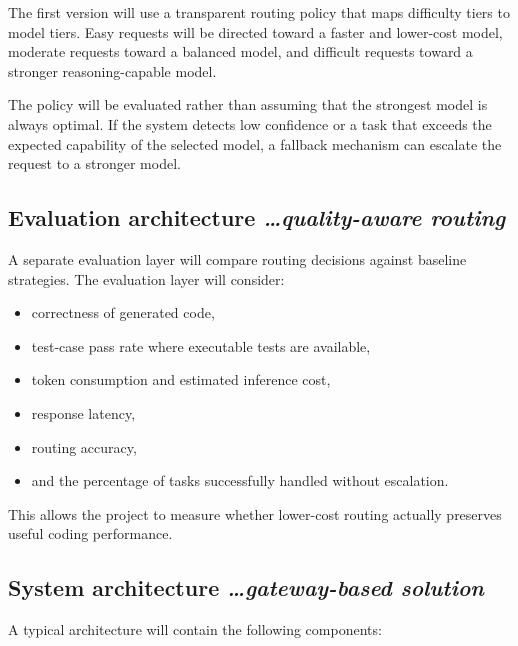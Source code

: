 \documentclass[11pt,a4paper]{article}
\newcommand{\BvrHint}[1]{%
  {\normalfont\normalsize\itshape\hfill #1}%
}
\begin{document}
The first version will use a transparent routing policy that
maps difficulty tiers to model tiers. Easy requests will be
directed toward a faster and lower-cost model, moderate
requests toward a balanced model, and difficult requests
toward a stronger reasoning-capable model.

The policy will be evaluated rather than assuming that the
strongest model is always optimal. If the system detects low
confidence or a task that exceeds the expected capability of
the selected model, a fallback mechanism can escalate the
request to a stronger model.

\subsection{Evaluation architecture%
  \texorpdfstring{\BvrHint{\ldots quality-aware routing}}{}}

A separate evaluation layer will compare routing decisions
against baseline strategies. The evaluation layer will
consider:

\begin{itemize}[leftmargin=0.7cm]

    \item correctness of generated code,
    \item test-case pass rate where executable tests are
    available,
    \item token consumption and estimated inference cost,
    \item response latency,
    \item routing accuracy,
    \item and the percentage of tasks successfully handled
    without escalation.

\end{itemize}

This allows the project to measure whether lower-cost routing
actually preserves useful coding performance.

\subsection{System architecture%
  \texorpdfstring{\BvrHint{\ldots gateway-based solution}}{}}

A typical architecture will contain the following components:
\end{document}
